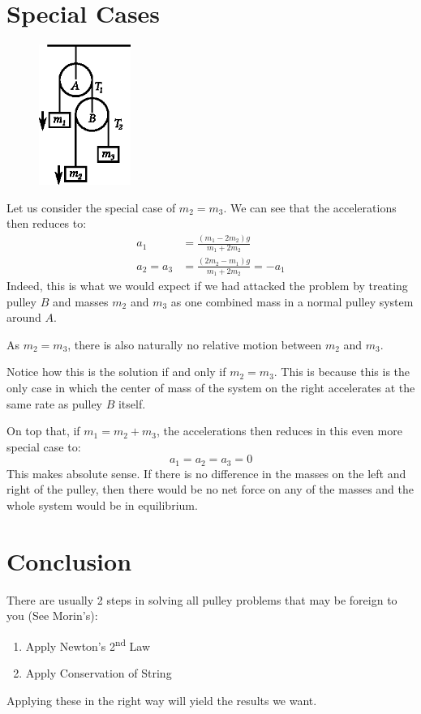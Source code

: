 \documentclass[11pt]{article}
\begin{document}
	\section*{Special Cases}	
	\begin{figure}
		\centering
		\vspace{-0.7cm}
		\includegraphics[width=3cm]{problem.eps}
		\vspace{-1cm}
	\end{figure}
	Let us consider the special case of $m_2 = m_3$. We can see that the accelerations then reduces to:
	\begin{align}
		a_1 &= \frac{(m_1-2m_2)g}{m_1+2m_2} \\
		a_2 = a_3 &= \frac{(2m_2-m_1)g}{m_1+2m_2} = -a_1
	\end{align}
	Indeed, this is what we would expect if we had attacked the problem by treating pulley $B$ and masses $m_2$ and $m_3$ as one combined mass in a normal pulley system around $A$. 
	
	As $m_2 = m_3$, there is also naturally no relative motion between $m_2$ and $m_3$.
	
	Notice how this is the solution if and only if $m_2 = m_3$. This is because this is the only case in which the center of mass of the system on the right accelerates at the same rate as pulley $B$ itself. 
	
	On top that, if $m_1 = m_2 + m_3$, the accelerations then reduces in this even more special case to:
	\begin{equation}
		a_1 = a_2 = a_3 = 0
	\end{equation}
	This makes absolute sense. If there is no difference in the masses on the left and right of the pulley, then there would be no net force on any of the masses and the whole system would be in equilibrium.
	
	\section*{Conclusion}
	There are usually 2 steps in solving all pulley problems that may be foreign to you (See Morin's):
	\begin{enumerate}
		\item Apply Newton's 2\textsuperscript{nd} Law
		\item Apply Conservation of String
	\end{enumerate}
	Applying these in the right way will yield the results we want. 
	
\end{document}
